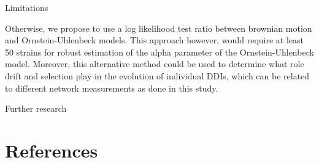 \documentclass[
]{article}
\begin{document}
Limitations

Otherwise, we propose to use a log likelihood test ratio between brownian motion and Ornstein-Uhlenbeck models. This approach however, would require at least 50 strains for robust estimation of the alpha parameter of the Ornstein-Uhlenbeck model. Moreover, this alternative method could be used to determine what role drift and selection play in the evolution of individual DDIs, which can be related to different network measurements as done in this study.

Further research

\hypertarget{references}{%
\section*{References}\label{references}}
\end{document}
